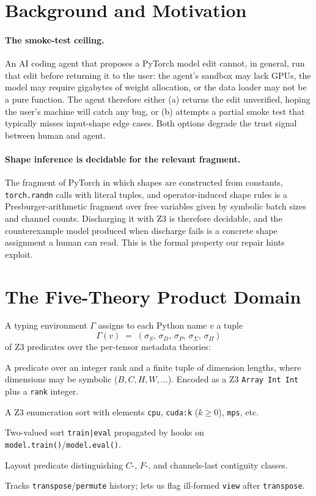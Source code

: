 \documentclass{article}
\theoremstyle{plain}
\theoremstyle{definition}
\newcommand{\code}[1]{\texttt{\small #1}}
\begin{document}
\section{Background and Motivation}\label{sec:background}

\paragraph{The smoke-test ceiling.}
An AI coding agent that proposes a PyTorch model edit cannot, in
general, run that edit before returning it to the user: the agent's
sandbox may lack GPUs, the model may require gigabytes of weight
allocation, or the data loader may not be a pure function.  The agent
therefore either (a) returns the edit unverified, hoping the user's
machine will catch any bug, or (b) attempts a partial smoke test that
typically misses input-shape edge cases.  Both options degrade the
trust signal between human and agent.

\paragraph{Shape inference is decidable for the relevant fragment.}
The fragment of PyTorch in which shapes are constructed from
constants, \code{torch.randn} calls with literal tuples, and
operator-induced shape rules is a Presburger-arithmetic fragment over
free variables given by symbolic batch sizes and channel counts.
Discharging it with Z3 is therefore decidable, and the
counterexample model produced when discharge fails is a concrete
shape assignment a human can read.  This is the formal property our
repair hints exploit.

\section{The Five-Theory Product Domain}\label{sec:domain}

A typing environment $\Gamma$ assigns to each Python name $v$ a
tuple
\[
\Gamma(v) \;=\; (\sigma_S,\, \sigma_D,\, \sigma_P,\, \sigma_{\Sigma},\, \sigma_\Pi)
\]
of Z3 predicates over the per-tensor metadata theories:
\begin{description}[nosep,leftmargin=*]
  \item[Shape ($\sigma_S$).]  A predicate over an integer rank and
    a finite tuple of dimension lengths, where dimensions may be
    symbolic ($B,C,H,W,\ldots$).  Encoded as a Z3 \code{Array Int
    Int} plus a \code{rank} integer.
  \item[Device ($\sigma_D$).]  A Z3 enumeration sort with elements
    \code{cpu}, \code{cuda:k} ($k \geq 0$), \code{mps}, etc.
  \item[Phase ($\sigma_P$).]  Two-valued sort \code{train|eval}
    propagated by hooks on \code{model.train()}/\code{model.eval()}.
  \item[Stride ($\sigma_{\Sigma}$).]  Layout predicate
    distinguishing $C$-, $F$-, and channels-last contiguity classes.
  \item[Permutation ($\sigma_\Pi$).]  Tracks
    \code{transpose}/\code{permute} history; lets us flag
    ill-formed \code{view} after \code{transpose}.
\end{description}
\end{document}
